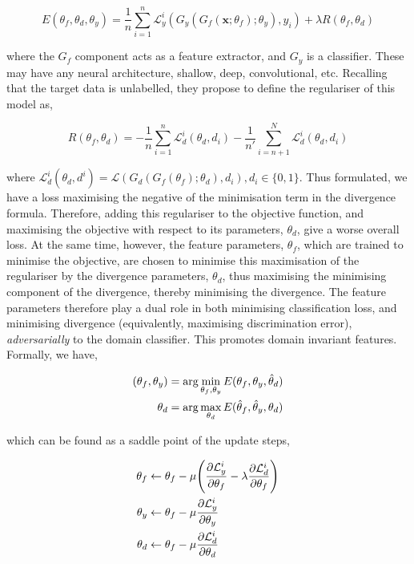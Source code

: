 $$E(\theta_f, \theta_d, \theta_y) = \frac{1}{n}\sum_{i=1}^n\mathcal{L}_y^i(G_y(G_f(\mathbf{x} ; \theta_f) ; \theta_y), y_i) + \lambda R(\theta_f, \theta_d)$$

where the $G_f$ component acts as a feature extractor, and $G_y$ is a classifier. These may have any neural architecture, shallow, deep, convolutional, etc. Recalling that the target data is unlabelled, they propose to define the regulariser of this model as,

$$R(\theta_f, \theta_d) = -\frac{1}{n}\sum_{i=1}^n\mathcal{L}_d^i(\theta_d, d_i) -\frac{1}{n'}\sum_{i=n+1}^N\mathcal{L}_d^i(\theta_d, d_i)$$

where $\mathcal{L}_d^i(\theta_d, d^i) = \mathcal{L}(G_d(G_f(\theta_f) ; \theta_d), d_i), d_i \in \{0, 1\}$. Thus formulated, we have a loss maximising the negative of the minimisation term in the divergence formula. Therefore, adding this regulariser to the objective function, and maximising the objective with respect to its parameters, $\theta_d$, give a worse overall loss. At the same time, however, the feature parameters, $\theta_f$, which are trained to minimise the objective, are chosen to minimise this maximisation of the regulariser by the divergence parameters, $\theta_d$, thus maximising the minimising component of the divergence, thereby minimising the divergence. The feature parameters therefore play a dual role in both minimising classification loss, and minimising divergence (equivalently, maximising discrimination error), \emph{adversarially} to the domain classifier. This promotes domain invariant features. Formally, we have,

\begin{align}
(\theta_f, \theta_y) &= \arg\min_{\theta_f, \theta_y} E(\theta_f, \theta_y, \hat{\theta}_d) \notag \\
\theta_d &= \arg\max_{\theta_d} E(\hat{\theta}_f, \hat{\theta}_y, \theta_d) \notag
\end{align}

which can be found as a saddle point of the update steps,

\begin{align}
\theta_f &\leftarrow \theta_f - \mu\Bigg(\frac{\partial \mathcal{L}_y^i}{\partial\theta_f} - \lambda\frac{\partial \mathcal{L}_d^i}{\partial\theta_f}\Bigg) \notag \\
\theta_y &\leftarrow \theta_f - \mu\frac{\partial \mathcal{L}_y^i}{\partial\theta_y} \notag \\
\theta_d &\leftarrow \theta_f - \mu\frac{\partial \mathcal{L}_d^i}{\partial\theta_d} \notag
\end{align}

